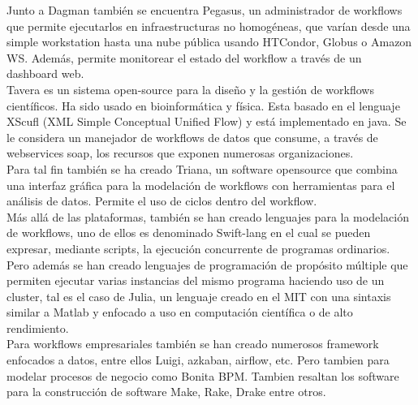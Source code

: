 Junto a Dagman también se encuentra Pegasus, un administrador de workflows que permite ejecutarlos en infraestructuras no homogéneas, que varían desde una simple workstation hasta una nube pública usando HTCondor, Globus o Amazon WS. Además, permite monitorear el estado del workflow a través de un dashboard web. \\

Tavera es un sistema open-source para la diseño y la gestión de workflows científicos. Ha sido usado en bioinformática y física. Esta basado en el lenguaje XScufl (XML  Simple   Conceptual  Unified  Flow) y está implementado en java. Se le considera un manejador de workflows de datos que consume, a través de webservices soap, los recursos que exponen numerosas organizaciones.\\

Para tal fin también se ha creado Triana, un software opensource que combina una interfaz gráfica para la modelación de workflows con herramientas para el análisis de datos. Permite el uso de ciclos dentro del workflow. \\


Más allá de las plataformas, también se han creado lenguajes para la modelación de workflows, uno de ellos es denominado Swift-lang en el cual se pueden expresar, mediante scripts, la ejecución concurrente de programas ordinarios. Pero además se han creado lenguajes de programación de propósito múltiple que permiten ejecutar varias instancias del mismo programa haciendo uso de un cluster, tal es el caso de Julia, un lenguaje creado en el MIT con una sintaxis similar a Matlab y enfocado a uso en computación científica o de alto rendimiento.\\

Para workflows empresariales también se han creado numerosos framework enfocados a datos, entre ellos Luigi, azkaban, airflow, etc. Pero tambien para modelar procesos de negocio como Bonita BPM. Tambien resaltan los software para la construcción de software Make, Rake, Drake entre otros.

